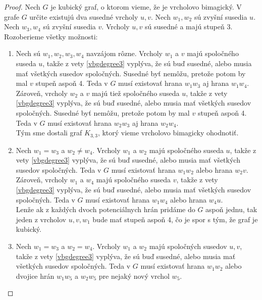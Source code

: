 \begin{proof} Nech $G$ je kubický graf, o ktorom vieme, že je vrcholovo bimagický. V grafe $G$ určite existujú dva susedné vrcholy $u,v$. Nech $w_1, w_2$ sú zvyšní susedia $u$. Nech $w_3, w_4$ sú zvyšní susedia $v$. Vrcholy $u,v$ sú susedné a majú stupeň 3. Rozoberieme všetky možnosti:

\begin{enumerate}
\item Nech sú $w_1, w_2, w_3, w_4$ navzájom rôzne. Vrcholy $w_1$ a $v$ majú spoločného suseda $u$, takže z vety \ref{vbgdegree3} vyplýva, že sú buď susedné, alebo musia mať všetkých susedov spoločných. Susedné byť nemôžu, pretože potom by mal $v$ stupeň aspoň 4. Teda v $G$ musí existovať hrana $w_1 w_3$ aj hrana $w_1 w_4$. \\

Zároveň, vrcholy $w_2$ a $v$ majú tiež spoločného suseda $u$, takže z vety \ref{vbgdegree3} vyplýva, že sú buď susedné, alebo musia mať všetkých susedov spoločných. Susedné byť nemôžu, pretože potom by mal $v$ stupeň aspoň 4. Teda v $G$ musí existovať hrana $w_2 w_3$ aj hrana $w_2 w_4$. \\

Tým sme dostali graf $K_{3,3}$, ktorý vieme vrcholovo bimagicky ohodnotiť.

\item Nech $w_1 = w_3$ a $w_2 \neq w_4$. Vrcholy $w_1$ a $w_2$ majú spoločného suseda $u$, takže z vety \ref{vbgdegree3} vyplýva, že sú buď susedné, alebo musia mať všetkých susedov spoločných. Teda v $G$ musí existovať hrana $w_1 w_2$ alebo hrana $w_2 v$. \\

Zároveň, vrcholy $w_1$ a $w_4$ majú spoločného suseda $v$, takže z vety \ref{vbgdegree3} vyplýva, že sú buď susedné, alebo musia mať všetkých susedov spoločných. Teda v $G$ musí existovať hrana $w_1 w_4$ alebo hrana $w_4 u$. \\

Lenže ak z každých dvoch potenciálnych hrán pridáme do $G$ aspoň jednu, tak jeden z vrcholov $u, v, w_1$ bude mať stupeň aspoň 4, čo je spor s tým, že graf je kubický.

\item Nech $w_1 = w_3$ a $w_2 = w_4$. Vrcholy $w_1$ a $w_2$ majú spoločných susedov $u,v$, takže z vety \ref{vbgdegree3} vyplýva, že sú buď susedné, alebo musia mať všetkých susedov spoločných. Teda v $G$ musí existovať hrana $w_1 w_2$ alebo dvojice hrán $w_1 w_5$ a $w_2 w_5$ pre nejaký nový vrchol $w_5$. \\


\end{enumerate}
\end{proof}
